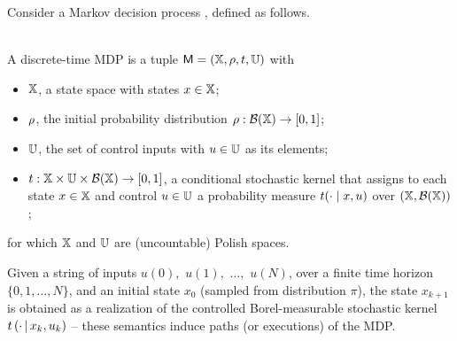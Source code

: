 \documentclass{ifacconf}
\begin{document}
    
Consider a Markov decision process \citep{bertsekas2004stochastic,mt1993,hll1996}, defined as follows.%
\begin{definition}\label{def:MDP} \mbox{ }\\
  A discrete-time MDP is a tuple $\mathsf{M} = ({\mathbb{X}}, \rho, t, {\mathbb{U}})$ with
  \begin{itemize}
    \item ${\mathbb{X}}$,  a state space with states $x\in{\mathbb{X}}$; %
    \item $\rho$, the initial probability distribution $\rho:\mathcal{B}({\mathbb{X}})\rightarrow [0,1]$;
    \item ${\mathbb{U}}$, the set of control inputs with $u\in{\mathbb{U}}$ as its elements;
    \item $t:{\mathbb{X}}\times{\mathbb{U}}\times\mathcal B({\mathbb{X}})\rightarrow[0,1]$, a conditional stochastic kernel that assigns to each state $x\in {\mathbb{X}}$ and control $u\in {\mathbb{U}}$ a probability measure $t(\cdot\mid x,u)$ over $({\mathbb{X}},\mathcal B({\mathbb{X}}))$;
  \end{itemize}
  for which ${\mathbb{X}}$ and ${\mathbb{U}}$ are (uncountable) Polish spaces.
 \end{definition}
Given a string of inputs
$u(0),$ $u(1), $ $\ldots, $ $u(N)$,
over a finite time horizon $\{0,1,\ldots, N\}$,
and an initial state  $x_0$ (sampled from distribution $\pi$),
the state $x_{k+1}$
is obtained as a realization of the controlled Borel-measurable stochastic kernel $t\left(\cdot{\,\mid\,} x_k, u_k \right)$ --
these semantics induce paths (or executions) of the MDP.
 

 
\end{document}
